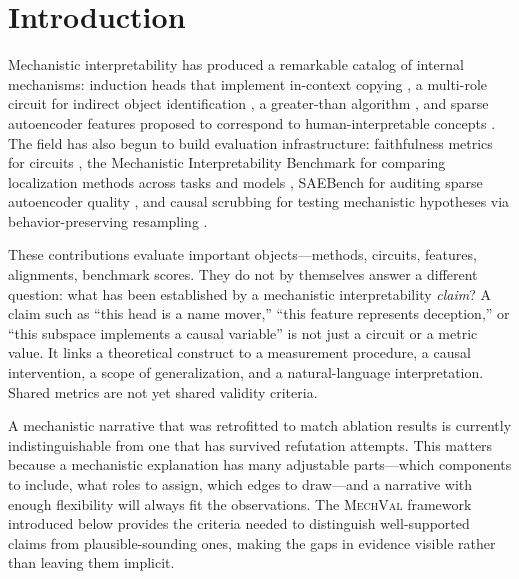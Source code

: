 \documentclass[10pt]{article}
\newcommand{\mechval}{\textsc{MechVal}}
\begin{document}
\section{Introduction}
\label{sec:intro}

Mechanistic interpretability has produced a remarkable catalog of internal mechanisms:
induction heads that implement in-context copying \citep{olsson2022context}, a multi-role
circuit for indirect object identification \citep{wang2023interpretability}, a greater-than
algorithm \citep{hanna2023greater}, and sparse autoencoder features proposed to correspond
to human-interpretable concepts \citep{cunningham2023sparse}. The field has also begun to
build evaluation infrastructure: faithfulness metrics for circuits
\citep{miller2024transformer}, the Mechanistic Interpretability Benchmark for comparing
localization methods across tasks and models \citep{mueller2025mib}, SAEBench for auditing
sparse autoencoder quality \citep{karvonen2025saebench}, and causal scrubbing for testing
mechanistic hypotheses via behavior-preserving resampling \citep{chan2022causal}.

These contributions evaluate important objects---methods, circuits, features, alignments,
benchmark scores. They do not by themselves answer a different question: what has been
established by a mechanistic interpretability \emph{claim}? A claim such as ``this head is
a name mover,'' ``this feature represents deception,'' or ``this subspace implements a
causal variable'' is not just a circuit or a metric value. It links a theoretical
construct to a measurement procedure, a causal intervention, a scope of generalization,
and a natural-language interpretation. Shared metrics are not yet shared validity criteria.

A mechanistic narrative that was retrofitted to match ablation results is currently
indistinguishable from one that has survived refutation attempts. This matters because a
mechanistic explanation has many adjustable parts---which components to include, what roles
to assign, which edges to draw---and a narrative with enough flexibility will always fit
the observations. The \mechval{} framework introduced below provides the criteria needed to
distinguish well-supported claims from plausible-sounding ones, making the gaps in evidence
visible rather than leaving them implicit.
\end{document}
